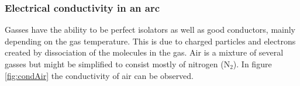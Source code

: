 \documentclass[10pt,a4paper]{article}
\begin{document}

\subsubsection{Electrical conductivity in an arc} \label{sec:eleCondArc}
Gasses have the ability to be perfect isolators as well as good conductors, mainly depending on the gas temperature. This is due to charged particles and electrons created by dissociation of the molecules in the gas. Air is a mixture of several gasses but might be simplified to consist mostly of nitrogen (N$_2$). In figure \ref{fig:condAir} the conductivity of air can be observed.   
\end{document}
